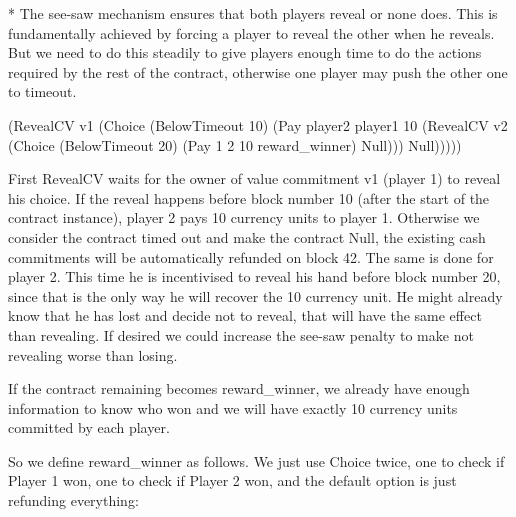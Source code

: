 \documentclass[
      acmsmall
    , screen
    , review=true
  ]{acmart}
\begin{document}
* The see-saw mechanism ensures that both players reveal or none does. This is fundamentally achieved by forcing a player to reveal the other when he reveals. But we need to do this steadily to give players enough time to do the actions required by the rest of the contract, otherwise one player may push the other one to timeout.

    (RevealCV v1
            (Choice (BelowTimeout 10)
                    (Pay player2 player1 10
                       (RevealCV v2
                              (Choice (BelowTimeout 20)
                                  (Pay 1 2 10
                                       reward\_winner)
                                  Null)))
                    Null)))))

First RevealCV waits for the owner of value commitment v1 (player 1) to reveal his choice. If the reveal happens before block number 10 (after the start of the contract instance), player 2 pays 10 currency units to player 1. Otherwise we consider the contract timed out and make the contract Null, the existing cash commitments will be automatically refunded on block 42.
The same is done for player 2. This time he is incentivised to reveal his hand before block number 20, since that is the only way he will recover the 10 currency unit. He might already know that he has lost and decide not to reveal, that will have the same effect than revealing. If desired we could increase the see-saw penalty to make not revealing worse than losing.


If the contract remaining becomes reward\_winner, we already have enough information to know who won and we will have exactly 10 currency units committed by each player.


So we define reward\_winner as follows. We just use Choice twice, one to check if Player 1 won, one to check if Player 2 won, and the default option is just refunding everything:
\end{document}
